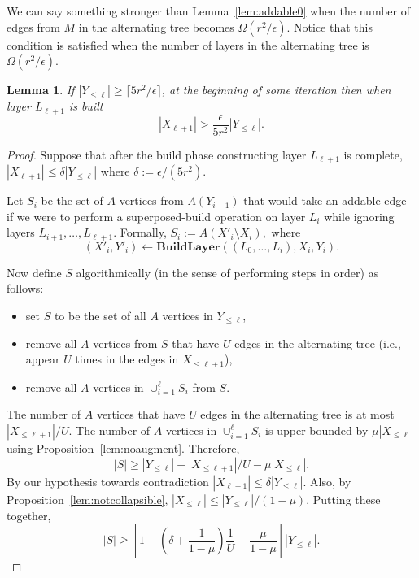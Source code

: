\documentclass[11pt]{article}
\newtheorem{lemma}[theorem]{Lemma}
\theoremstyle{definition}
\theoremstyle{remark}
\begin{document}
We can say something stronger than Lemma~\ref{lem:addable0} when the
number of edges from $M$ in the alternating tree becomes $\Omega(r^2/\epsilon)$. Notice that this condition is satisfied when the number of layers in the alternating tree is $\Omega(r^2/\epsilon)$.

\begin{lemma}\label{lem:addable1}
  If $|Y_{\leq \ell}| \geq \lceil 5r^2/\epsilon \rceil$, at the beginning of some iteration then when layer $L_{\ell+1}$ is built
\[ |X_{\ell+1}| > \frac{\epsilon}{5r^2} |Y_{\leq \ell}|.\]
\end{lemma}
\begin{proof}
  Suppose that after the build phase constructing layer $L_{\ell+1}$ is complete, $|X_{\ell+1}| \leq \delta|Y_{\leq \ell}|$ where $\delta := \epsilon/(5r^2)$. 

  Let $S_i$ be the set of $A$ vertices from $A(Y_{i-1})$ that would
  take an addable edge if we were to perform a superposed-build
  operation on layer $L_i$ while ignoring layers
  $L_{i+1},\dots,L_{\ell+1}$. Formally, $S_i := A(X'_i \setminus
  X_i),$ where
  \[(X'_i, Y'_i) \gets \textbf{BuildLayer}((L_0,\dots, L_i), X_i,
    Y_i).\]

  Now define $S$ algorithmically (in the sense of performing steps in
  order) as follows:
  \begin{itemize}
  \item set $S$ to be the set of all $A$ vertices in $Y_{\leq \ell}$,
  \item remove all $A$ vertices from $S$ that have $U$ edges in the alternating tree (i.e., appear $U$ times in the edges in $X_{\leq \ell+1}$),
  \item remove all $A$ vertices in $\cup_{i=1}^{\ell} S_i$ from $S$.
  \end{itemize}
The number of $A$ vertices that have $U$ edges in the alternating tree is at most $|X_{\leq \ell+1}|/U$. The number of $A$ vertices in $\cup_{i=1}^\ell S_i$ is upper bounded by $\mu|X_{\leq \ell}|$ using Proposition~\ref{lem:noaugment}. Therefore, \[|S| \geq |Y_{\leq \ell}| - |X_{\leq \ell+1}|/U - \mu|X_{\leq \ell}|.\]
By our hypothesis towards contradiction $|X_{\ell+1}| \leq \delta|Y_{\leq \ell}|.$ Also, by Proposition~\ref{lem:notcollapsible}, $|X_{\leq \ell}| \leq |Y_{\leq \ell}|/(1-\mu).$ Putting these together,
\[ |S| \geq \left[1 - \left(\delta + \frac{1}{1-\mu}\right)\frac1U -\frac{\mu}{1-\mu} \right] |Y_{\leq \ell}|.\]


\end{proof}
\end{document}
